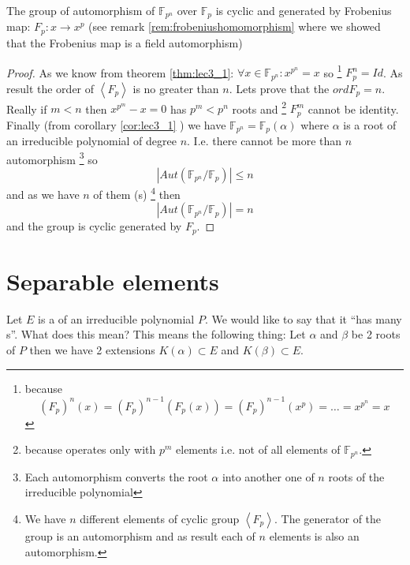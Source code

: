 \begin{corollary}
  The group of automorphism of $\mathbb{F}_{p^n}$ over
  $\mathbb{F}_{p}$ is cyclic and generated by Frobenius map:
  $F_p: x \to x^p$
  (see remark \ref{rem:frobeniushomomorphism} where we showed that the
  Frobenius map is a field automorphism) 
  \begin{proof}
    As we know from theorem \ref{thm:lec3_1}:
    $\forall x \in \mathbb{F}_{p^n}: x^{p^n} = x$ so
    \footnote{
      because
      \[
      \left(F_p\right)^n\left(x\right) =
      \left(F_p\right)^{n-1}\left(F_p\left(x\right)\right) =
      \left(F_p\right)^{n-1}\left(x^p\right) = \dots = x^{p^n} = x
      \]
    }
    $F_p^n = Id$. As result the order of $\left<F_p\right>$ is no
    greater than $n$. Lets prove that the $ord F_p = n$.
    Really if $m < n$ then
    $x^{p^m} - x =0$ has $p^m < p^n$ roots and
    \footnote{
      because operates only with $p^m$ elements i.e. not of all
      elements of $\mathbb{F}_{p^n}$.
    }
    $F_p^m$ cannot be identity.
    Finally (from corollary \ref{cor:lec3_1} ) we have
    $\mathbb{F}_{p^n} = \mathbb{F}_p\left(\alpha\right)$ where
    $\alpha$ is a root of an irreducible polynomial of degree
    $n$. I.e. there cannot be more than $n$ automorphism
    \footnote{
      Each automorphism converts the root $\alpha$ into another one
      of $n$ roots of the irreducible polynomial
    }
    so
    \[
    \left|
    Aut\left(
    \mathbb{F}_{p^n}/\mathbb{F}_{p}
    \right)
    \right| \le n
    \]
    and as we have $n$ of them (s)
    \footnote{
      We have $n$ different elements of cyclic group
      $\left<F_p\right>$. The generator of the group is an
      automorphism and as result each of $n$ elements is also an
      automorphism. 
    }
    then
    \[
    \left|
    Aut\left(
    \mathbb{F}_{p^n}/\mathbb{F}_{p}
    \right)
    \right| = n
    \]
    and the group is cyclic generated by $F_p$.
  \end{proof}
  \label{cor:lec3_2}
\end{corollary}

\section{Separable elements}

Let $E$ is a  of an irreducible polynomial
$P$. We would like to say that it ``has many
s''. What does this mean? This means the
following thing:
Let $\alpha$ and $\beta$ be 2 roots of $P$ then we have 2 extensions
$K\left(\alpha\right) \subset E$ and 
$K\left(\beta\right) \subset E$.

